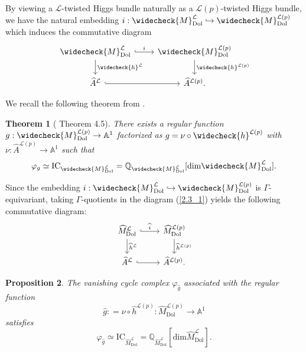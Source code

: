 \documentclass[11pt]{amsart}
\theoremstyle{plain}
\newtheorem{thm}{Theorem}[section]
\newtheorem{prop}[thm]{Proposition}
\theoremstyle{definition}
\theoremstyle{remark}
\newcommand{\BA}{{\mathbb{A}}}
\newcommand{\BQ}{{\mathbb{Q}}}
\newcommand{\CL}{{\mathcal L}}
\begin{document}
By viewing a $\CL$-twisted Higgs bundle naturally as a $\CL(p)$-twisted Higgs bundle, we have the natural embedding $i: \widecheck{M}^\CL_{\mathrm{Dol}} \hookrightarrow \widecheck{M}^{\CL(p)}_{\mathrm{Dol}}$ which induces the commutative diagram
\begin{equation}\label{2.3_1}
\begin{tikzcd}
\widecheck{M}^\CL_{\mathrm{Dol}}\arrow[r, hook,"i"] \arrow[d, "\widecheck{h}^\CL"]
&\widecheck{M}^{\CL(p)}_{\mathrm{Dol}} \arrow[d, "\widecheck{h}^{\CL(p)}"] \\
\widehat{A}^\CL \arrow[r,hook]
& \widehat{A}^{\CL(p)}.
\end{tikzcd}
\end{equation}

We recall the following theorem from \cite{MS}.

\begin{thm}[\cite{MS} Theorem 4.5]\label{thm2.5}
There exists a regular function $g: \widecheck{M}^{\CL(p)}_{\mathrm{Dol}} \to \BA^1$ factorized as $g = \nu \circ \widecheck{h}^{\CL(p)}$ with $\nu: \widehat{A}^{\CL(p)} \to \BA^1$ such that
\[
\varphi_g \simeq \mathrm{IC}_{\widecheck{M}^{\CL}_{\mathrm{Dol}}} = \BQ_{\widecheck{M}^{\CL}_{\mathrm{Dol}}}[\mathrm{dim} \widecheck{M}^{\CL}_{\mathrm{Dol}}].
\]
\end{thm}

Since the embedding $i: \widecheck{M}^\CL_{\mathrm{Dol}} \hookrightarrow \widecheck{M}^{\CL(p)}_{\mathrm{Dol}}$ is $\Gamma$-equivariant, taking $\Gamma$-quotients in the diagram (\ref{2.3_1}) yields the following commutative diagram:
\begin{equation}\label{diagram3}
\begin{tikzcd}
\widehat{M}^\CL_{\mathrm{Dol}}\arrow[r, hook, "\widehat{i}"] \arrow[d, "\widehat{h}^\CL"]
&\widehat{M}^{\CL(p)}_{\mathrm{Dol}} \arrow[d, "\widehat{h}^{\CL(p)}"] \\
\widehat{A}^\CL \arrow[r, hook]
& \widehat{A}^{\CL(p)}.
\end{tikzcd}
\end{equation}


\begin{prop}\label{prop2.6}
The vanishing cycle complex $\varphi_{\widehat{g}}$ associated with the regular function
\[
\widehat{g}: = \nu \circ \widehat{h}^{\CL(p)}: \widehat{M}^{\CL(p)}_{\mathrm{Dol}} \to \BA^1
\]
satisfies
\[
\varphi_{\widehat{g}} \simeq \mathrm{IC}_{\widehat{M}^{\CL}_{\mathrm{Dol}}} = \BQ_{\widehat{M}^{\CL}_{\mathrm{Dol}}}\left[\mathrm{dim} \widehat{M}^{\CL}_{\mathrm{Dol}}\right].\]
\end{prop}
\end{document}
